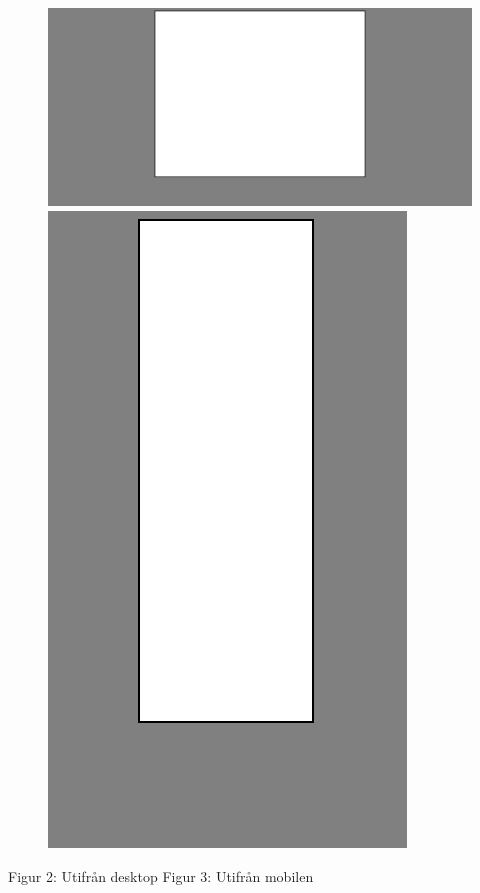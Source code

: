 \documentclass[11pt]{article}
\begin{document}
\vspace{0.5cm}
\begin{figure}[h]
\centerline{%
\includegraphics[scale=0.23]{pics/big.png}\hspace{5em}%
\includegraphics[scale=0.30]{pics/small.png}%
}
\end{figure}
\hspace{1.5cm}Figur 2: Utifrån desktop \hspace{4.8cm} Figur 3: Utifrån mobilen
\end{document}
